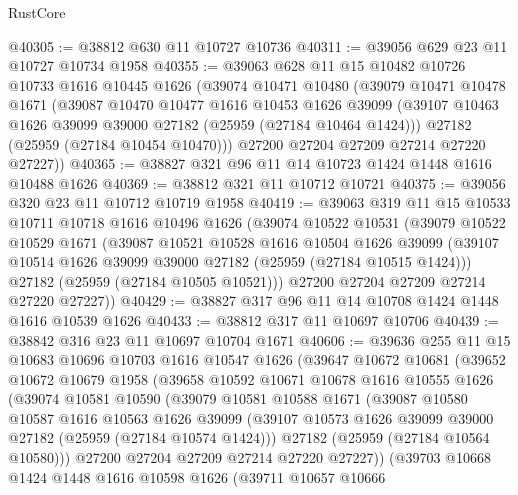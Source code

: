 \begin{lexlean}{RustCore}
\begin{coremodule}
@40305 := @38812 @630 @11 @10727 @10736
@40311 := @39056 @629 @23 @11 @10727 @10734 @1958
@40355 := @39063
    @628
    @11
    @15
    @10482
    @10726
    @10733
    @1616
    @10445
    @1626
    (@39074
      @10471
      @10480
      (@39079
        @10471
        @10478
        @1671
        (@39087
          @10470
          @10477
          @1616
          @10453
          @1626
          @39099
          (@39107 @10463 @1626 @39099 @39000 @27182 (@25959 (@27184 @10464 @1424)))
          @27182
          (@25959 (@27184 @10454 @10470)))
        @27200
        @27204
        @27209
        @27214
        @27220
        @27227))
@40365 := @38827 @321 @96 @11 @14 @10723 @1424 @1448 @1616 @10488 @1626
@40369 := @38812 @321 @11 @10712 @10721
@40375 := @39056 @320 @23 @11 @10712 @10719 @1958
@40419 := @39063
    @319
    @11
    @15
    @10533
    @10711
    @10718
    @1616
    @10496
    @1626
    (@39074
      @10522
      @10531
      (@39079
        @10522
        @10529
        @1671
        (@39087
          @10521
          @10528
          @1616
          @10504
          @1626
          @39099
          (@39107 @10514 @1626 @39099 @39000 @27182 (@25959 (@27184 @10515 @1424)))
          @27182
          (@25959 (@27184 @10505 @10521)))
        @27200
        @27204
        @27209
        @27214
        @27220
        @27227))
@40429 := @38827 @317 @96 @11 @14 @10708 @1424 @1448 @1616 @10539 @1626
@40433 := @38812 @317 @11 @10697 @10706
@40439 := @38842 @316 @23 @11 @10697 @10704 @1671
@40606 := @39636
    @255
    @11
    @15
    @10683
    @10696
    @10703
    @1616
    @10547
    @1626
    (@39647
      @10672
      @10681
      (@39652
        @10672
        @10679
        @1958
        (@39658
          @10592
          @10671
          @10678
          @1616
          @10555
          @1626
          (@39074
            @10581
            @10590
            (@39079
              @10581
              @10588
              @1671
              (@39087
                @10580
                @10587
                @1616
                @10563
                @1626
                @39099
                (@39107 @10573 @1626 @39099 @39000 @27182 (@25959 (@27184 @10574 @1424)))
                @27182
                (@25959 (@27184 @10564 @10580)))
              @27200
              @27204
              @27209
              @27214
              @27220
              @27227))
          (@39703
            @10668
            @1424
            @1448
            @1616
            @10598
            @1626
            (@39711
              @10657
              @10666

\end{coremodule}
\end{lexlean}
